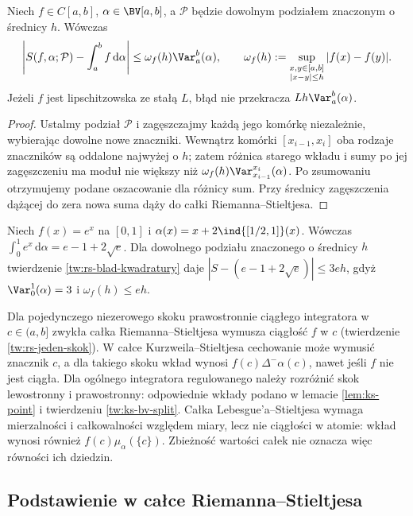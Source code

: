 \begin{twierdzenie}\label{tw:rs-blad-kwadratury}
Niech $f\in C[a,b]$, $\alpha\in\BV[a,b]$, a $\mathcal P$ będzie dowolnym podziałem znaczonym o średnicy $h$. Wówczas
\[
\left|S(f,\alpha;\mathcal P)-\int_a^b f\,\mathrm d\alpha\right|
\le \omega_f(h)\Var_a^b(\alpha),
\qquad
\omega_f(h):=\sup_{\substack{x,y\in[a,b]\\|x-y|\le h}}|f(x)-f(y)|.
\]
Jeżeli $f$ jest lipschitzowska ze stałą $L$, błąd nie przekracza $Lh\Var_a^b(\alpha)$.
\end{twierdzenie}
\begin{proof}
Ustalmy podział $\mathcal P$ i zagęszczajmy każdą jego komórkę niezależnie, wybierając dowolne nowe znaczniki. Wewnątrz komórki $[x_{i-1},x_i]$ oba rodzaje znaczników są oddalone najwyżej o $h$; zatem różnica starego wkładu i sumy po jej zagęszczeniu ma moduł nie większy niż $\omega_f(h)\Var_{x_{i-1}}^{x_i}(\alpha)$. Po zsumowaniu otrzymujemy podane oszacowanie dla różnicy sum. Przy średnicy zagęszczenia dążącej do zera nowa suma dąży do całki Riemanna--Stieltjesa.
\end{proof}
\begin{przyklad}
Niech $f(x)=e^x$ na $[0,1]$ i $\alpha(x)=x+2\ind{[1/2,1]}(x)$. Wówczas
$\int_0^1e^x\,\mathrm d\alpha=e-1+2\sqrt e$.
Dla dowolnego podziału znaczonego o średnicy $h$ twierdzenie \ref{tw:rs-blad-kwadratury} daje
$|S-(e-1+2\sqrt e)|\le 3eh$, gdyż $\Var_0^1(\alpha)=3$ i $\omega_f(h)\le eh$.
\end{przyklad}
\begin{uwaga}
Dla pojedynczego niezerowego skoku prawostronnie ciągłego integratora w $c\in(a,b]$ zwykła całka Riemanna--Stieltjesa wymusza ciągłość $f$ w $c$ (twierdzenie \ref{tw:rs-jeden-skok}). W całce Kurzweila--Stieltjesa cechowanie może wymusić znacznik $c$, a dla takiego skoku wkład wynosi $f(c)\Delta^-\alpha(c)$, nawet jeśli $f$ nie jest ciągła. Dla ogólnego integratora regulowanego należy rozróżnić skok lewostronny i prawostronny: odpowiednie wkłady podano w lemacie \ref{lem:ks-point} i twierdzeniu \ref{tw:ks-bv-split}. Całka Lebesgue'a--Stieltjesa wymaga mierzalności i całkowalności względem miary, lecz nie ciągłości w atomie: wkład wynosi również $f(c)\mu_\alpha(\{c\})$. Zbieżność wartości całek nie oznacza więc równości ich dziedzin.
\end{uwaga}


\subsection{Podstawienie w całce Riemanna--Stieltjesa}

